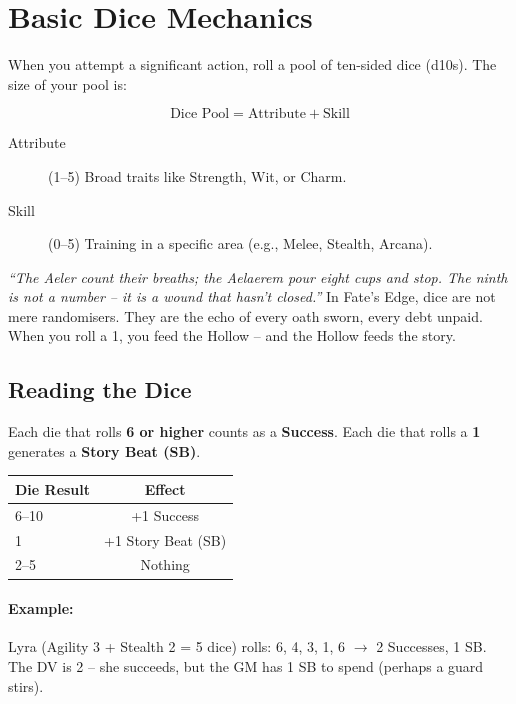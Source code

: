\section{Basic Dice Mechanics}
\label{sec:dice-mechanics}

When you attempt a significant action, roll a pool of ten-sided dice (d10s). The size of your pool is:

\[
\text{Dice Pool} = \text{Attribute} + \text{Skill}
\]

\begin{description}
  \item[Attribute] (1--5) Broad traits like Strength, Wit, or Charm.
  \item[Skill] (0--5) Training in a specific area (e.g., Melee, Stealth, Arcana).
\end{description}

\begin{tcolorbox}[colback=red!5!white,colframe=red!75!black,title=\textit{Lore of the Fall: The Weight of Numbers},breakable]
\emph{``The Aeler count their breaths; the Aelaerem pour eight cups and stop. The ninth is not a number -- it is a wound that hasn't closed.''}  
In Fate's Edge, dice are not mere randomisers. They are the echo of every oath sworn, every debt unpaid. When you roll a 1, you feed the Hollow -- and the Hollow feeds the story.
\end{tcolorbox}

\subsection*{Reading the Dice}

Each die that rolls \textbf{6 or higher} counts as a \textbf{Success}.  
Each die that rolls a \textbf{1} generates a \textbf{Story Beat (SB)}.

\begin{center}
\begin{tabular}{lc}
\toprule
\textbf{Die Result} & \textbf{Effect} \\
\midrule
6--10 & +1 Success \\
1 & +1 Story Beat (SB) \\
2--5 & Nothing \\
\bottomrule
\end{tabular}
\end{center}

\paragraph{Example:} Lyra (Agility 3 + Stealth 2 = 5 dice) rolls: 6, 4, 3, 1, 6 $\rightarrow$ 2 Successes, 1 SB. The DV is 2 -- she succeeds, but the GM has 1 SB to spend (perhaps a guard stirs).

